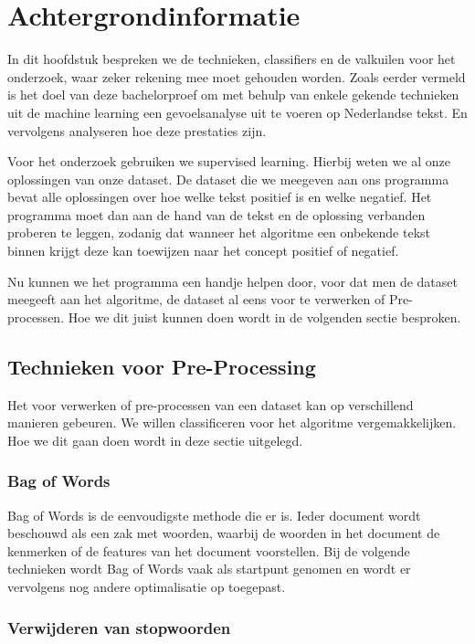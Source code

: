 
\chapter{Achtergrondinformatie}\label{Achtergrondinformatie}

In dit hoofdstuk bespreken we de technieken, classifiers en de valkuilen voor het onderzoek, waar zeker rekening mee moet gehouden worden. Zoals eerder vermeld is het doel van deze bachelorproef om met behulp van enkele gekende technieken uit de machine learning een gevoelsanalyse uit te voeren op Nederlandse tekst. En vervolgens analyseren hoe deze prestaties zijn.

Voor het onderzoek gebruiken we supervised learning. Hierbij weten we al onze oplossingen van onze dataset. De dataset die we meegeven aan ons programma bevat alle oplossingen over hoe welke tekst positief is en welke negatief. Het programma moet dan aan de hand van de tekst en de oplossing verbanden proberen te leggen, zodanig dat wanneer het algoritme een onbekende tekst binnen krijgt deze kan toewijzen naar het concept positief of negatief.

Nu kunnen we het programma een handje helpen door, voor dat men de dataset meegeeft aan het algoritme, de dataset al eens voor te verwerken of Pre-processen. Hoe we dit juist kunnen doen wordt in de volgenden sectie besproken.

\section{Technieken voor Pre-Processing}\label{Technieken voor Pre-Processing}

Het voor verwerken of pre-processen van een dataset kan op verschillend manieren gebeuren. We willen classificeren voor het algoritme vergemakkelijken. Hoe we dit gaan doen wordt in deze sectie uitgelegd.

\subsection{Bag of Words}\label{Bag of Words}

Bag of Words is de eenvoudigste methode die er is. Ieder document wordt beschouwd als een zak met woorden, waarbij de woorden in het document de kenmerken of de features van het document voorstellen. Bij de volgende technieken wordt Bag of Words vaak als startpunt genomen en wordt er vervolgens nog andere optimalisatie op toegepast.

\subsection{Verwijderen van stopwoorden}\label{Verwijderen van stopwoorden en leestekens}

